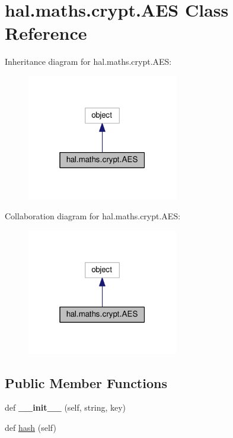 \hypertarget{classhal_1_1maths_1_1crypt_1_1_a_e_s}{}\section{hal.\+maths.\+crypt.\+A\+ES Class Reference}
\label{classhal_1_1maths_1_1crypt_1_1_a_e_s}


Inheritance diagram for hal.\+maths.\+crypt.\+A\+ES\+:
\nopagebreak
\begin{figure}[H]
\begin{center}
\leavevmode
\includegraphics[width=187pt]{classhal_1_1maths_1_1crypt_1_1_a_e_s__inherit__graph}
\end{center}
\end{figure}


Collaboration diagram for hal.\+maths.\+crypt.\+A\+ES\+:
\nopagebreak
\begin{figure}[H]
\begin{center}
\leavevmode
\includegraphics[width=187pt]{classhal_1_1maths_1_1crypt_1_1_a_e_s__coll__graph}
\end{center}
\end{figure}
\subsection*{Public Member Functions}
\begin{DoxyCompactItemize}
\item 
def {\bfseries \+\_\+\+\_\+init\+\_\+\+\_\+} (self, string, key)\hypertarget{classhal_1_1maths_1_1crypt_1_1_a_e_s_a384607218f6de8a5bf2091a8913f02a2}{}\label{classhal_1_1maths_1_1crypt_1_1_a_e_s_a384607218f6de8a5bf2091a8913f02a2}

\item 
def \hyperlink{classhal_1_1maths_1_1crypt_1_1_a_e_s_ab7bd23c02bda2da94f6a2437f906cd09}{hash} (self)
\end{DoxyCompactItemize}
